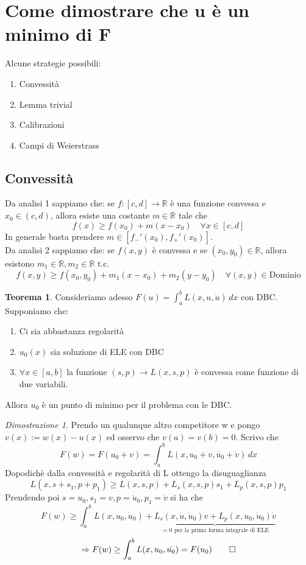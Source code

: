 \documentclass[a4paper]{book}
\theoremstyle{definition}
\theoremstyle{remark}
\newtheorem{dimst}{Dimostrazione}
\theoremstyle{definition}
\newtheorem{teo}{Teorema}
\newcommand{\bbr}{\mathbb{R}}
\newcommand{\ra}{\Rightarrow}
\begin{document}
\section{Come dimostrare che u è un minimo di F}
Alcune strategie possibili:\\
\begin{enumerate}
\item Convessità
\item Lemma trivial
\item Calibrazioni
\item Campi di Weierstrass
\end{enumerate}

\subsection{Convessità}
Da analisi 1 sappiamo che: se $f:[c,d]\to\bbr$ è una funzione convessa e $x_0 \in (c,d)$, allora esiste una costante $m\in\bbr$ tale che 
\[
	f(x)\ge f(x_0)+m(x-x_0)\quad\forall x \in [c,d]
\]
In generale basta prendere $m \in [f_-'(x_0), f_+'(x_0)]$.\\
Da analisi 2 sappiamo che: se $f(x,y)$ è convessa e se $(x_0, y_0)\in \bbr$, allora esistono $m_1\in\bbr, m_2\in\bbr$ t.c.
\[
	f(x, y)\ge f(x_0, y_0) + m_1(x-x_0) + m_2(y-y_0)\quad \forall(x,y)\in\text{Dominio}
\]

\begin{teo}
Consideriamo adesso $F(u) = \int_{a}^{b}L(x, u, \dot{u})\,dx$ con DBC.\\
Supponiamo che:\\
\begin{enumerate}
\item Ci sia abbastanza regolarità
\item $u_0(x)$ sia soluzione di ELE con DBC
\item $\forall x \in [a,b]$ la funzione $(s,p)\to L(x, s, p)$ è convessa come funzione di due variabili.
\end{enumerate}
Allora $u_0$ è un punto di minimo per il problema con le DBC.
\end{teo}

\begin{dimst}
Prendo un qualunque altro competitore w e pongo $v(x) := w(x)-u(x)$ ed osservo che $v(a)=v(b)=0$. Scrivo che 
\[
	F(w) = F(u_0 + v) = \int_{a}^{b} L(x, u_0 + v, \dot{u_0} + \dot{v})\,dx
\]
Dopodichè dalla convessità e regolarità di L ottengo la disuguaglianza
\[
	L(x, s +s_1, p+p_1)\ge L(x, s, p) + L_s(x, s, p)s_1 + L_p(x, s, p)p_1
\]
Prendendo poi $s = u_0 , s_1 = v, p = \dot{u}_0, p_1 = \dot{v}$ si ha che
\[
	F(w)\ge \int_{a}^{b}L(x, u_0, \dot{u}_0) + \underbrace{L_s(x, u, \dot{u}_0)v + L_p(x, u_0, \dot{u}_0)\dot{v}}_{= 0 \text{ per la prima forma integrale di ELE}}
\]
\[
	\ra F(w)\ge \int_{a}^{b}L(x, u_0, \dot{u_0}) = F(u_0) \qed
\]
\end{dimst}
\end{document}
